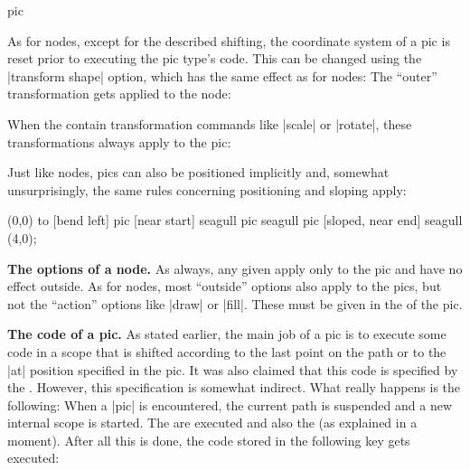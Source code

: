 \begin{pathoperation}{pic}
\begin{codeexample}[]
\end{codeexample}

  As for nodes, except for the described shifting, the coordinate
  system of a pic is reset prior to executing the pic type's
  code. This can be changed using the |transform shape| option, which
  has the same effect as for nodes: The ``outer'' transformation gets
  applied to the node:
\begin{codeexample}[]
\end{codeexample}

  When the  contain transformation commands like |scale|
  or |rotate|, these transformations always apply to the pic:
\begin{codeexample}[]
\end{codeexample}

  Just like nodes, pics can also be positioned implicitly and,
  somewhat unsurprisingly, the same rules concerning positioning and
  sloping apply:
\begin{codeexample}[]
\tikz \draw
  (0,0) to [bend left] 
           pic [near start]       {seagull} 
           pic                    {seagull}
           pic [sloped, near end] {seagull} (4,0);
\end{codeexample}
  
  \medskip
  \textbf{The options of a node.}
  As always, any given  apply only to the pic and have
  no effect outside. As for nodes, most ``outside'' options also apply
  to the pics, but not the ``action'' options like |draw| or
  |fill|. These must be given in the  of the pic.

  \medskip
  \textbf{The code of a pic.}
  As stated earlier, the main job of a pic is to execute some code in
  a scope that is shifted according to the last point on the path or
  to the |at| position specified in the pic. It was also claimed that
  this code is specified by the . However, this
  specification is somewhat indirect. What really happens is the
  following: When a |pic| is encountered, the current path is
  suspended and a new internal scope is started. The 
  are executed and also the  (as explained
  in a moment). After all this is done, the code stored in the following key
  gets executed:


\end{pathoperation}
